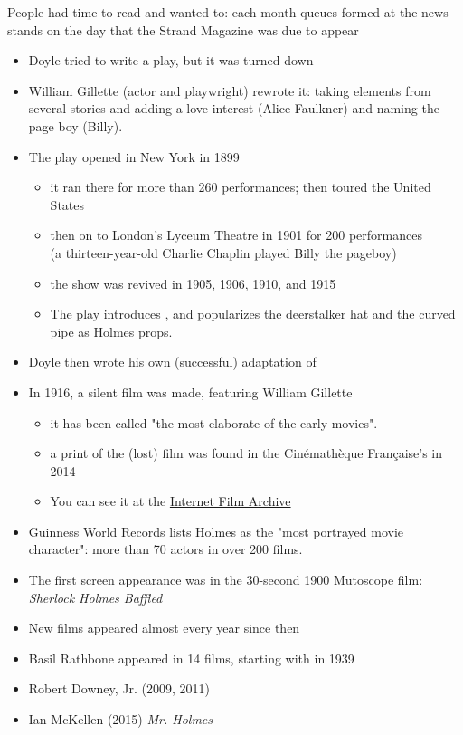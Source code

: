 \documentclass[a4paper,landscape,headrule,footrule,xetex]{foils}
\begin{document}
People had time to read and wanted to: each month queues formed at the
news-stands on the day that the Strand Magazine was due to appear





\begin{itemize} \addtolength{\itemsep}{-1ex}
\item Doyle tried to write a play, but it was turned down 
\item William Gillette (actor and playwright) rewrote it: taking
  elements from several stories and adding a love interest (Alice
  Faulkner) and naming the page boy (Billy).
\item The play opened in New York in 1899 
  \begin{itemize}
  \item it ran there for more than 260 performances; then toured the United States
  \item then on to  London's Lyceum Theatre in 1901 for 200 performances
    \\ (a thirteen-year-old Charlie Chaplin played Billy the pageboy)
  \item the show was revived in 1905, 1906, 1910, and 1915
  \item The play introduces , and
    popularizes the deerstalker hat 
    and the curved pipe as Holmes props.
  \end{itemize}
\item Doyle then wrote his own (successful) adaptation of 
\item In 1916, a silent film was made, featuring  William Gillette
  \begin{itemize}
  \item it has been called "the most elaborate of the early movies".
  \item  a print of the (lost) film was found in the Cinémathèque Française's in 2014
\item You can see it at the
  \href{https://archive.org/details/SherlockHolmes1916}{Internet Film Archive}
  \end{itemize}
\end{itemize}


\begin{itemize}
\item Guinness World Records lists Holmes as the "most portrayed movie
  character": more than 70 actors in over 200 films.
\item The first screen appearance was in the 30-second 1900 Mutoscope film: \textit{Sherlock Holmes Baffled}
\item New films appeared almost every year since then 
\item Basil Rathbone appeared in 14 films, starting with  in 1939
\item Robert Downey, Jr. (2009, 2011)
\item Ian McKellen (2015) \textit{Mr. Holmes}
\end{itemize}
\end{document}
